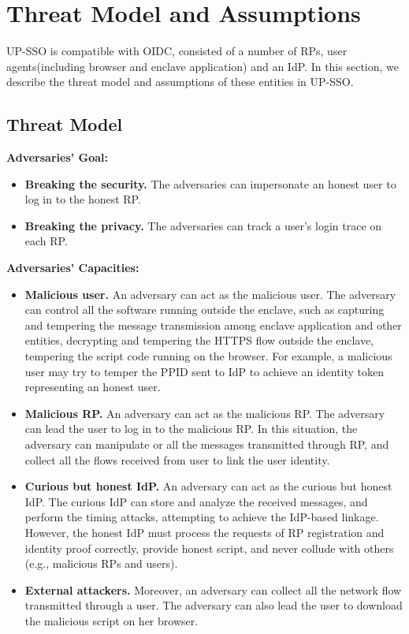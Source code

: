 \section{Threat Model and Assumptions}
\label{sec:threatmodel}
UP-SSO is compatible with OIDC, consisted of a number of RPs, user agents(including browser and enclave application) and an IdP. In this section, we describe the threat model and assumptions of these entities in UP-SSO.
\subsection{Threat Model}
\noindent\textbf{Adversaries' Goal: } 
\begin{itemize}
\item \noindent\textbf{Breaking the security. }The adversaries can impersonate an honest user to log in to the honest RP.
\item \noindent\textbf{Breaking the privacy. }The adversaries can track a user's login trace on each RP.
\end{itemize} 

\noindent\textbf{Adversaries' Capacities: }
\begin{itemize}
\item \noindent\textbf{Malicious user. }An adversary can act as the malicious user. The adversary can control all the software running outside the enclave, such as capturing and tempering the message transmission among enclave application and other entities, decrypting and tempering the HTTPS flow outside the enclave, tempering the script code running on the browser. For example, a malicious user may try to temper the PPID sent to IdP to achieve an identity token representing an honest user. 
\item \noindent\textbf{Malicious RP. }An adversary can act as the malicious RP. The adversary can lead the user to log in to the malicious RP. In this situation, the adversary can manipulate or all the messages transmitted through RP, and collect all the flows received from user to link the user identity. 
\item \noindent\textbf{Curious but honest IdP. }An adversary can act as the curious but honest IdP. The curious IdP can store and analyze the received messages, and perform the timing attacks, attempting to achieve the IdP-based linkage. However, the honest IdP must process the requests of RP registration and identity proof correctly, provide honest script, and never collude with others (e.g., malicious RPs and users).
\item \noindent\textbf{External attackers. }Moreover, an adversary can collect all the network flow transmitted through a user. The adversary can also lead the user to download the malicious script on her browser.
\end{itemize}

